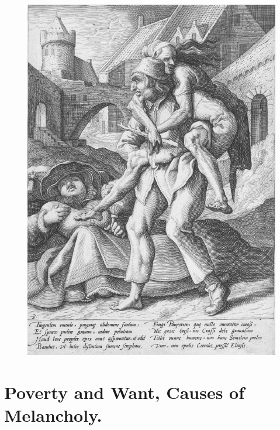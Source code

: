 {\begin{figure}[p]
  \begingroup
  \centering
  \includegraphics[keepaspectratio,width=\textwidth]{figures/carrying-povery-small.jpg}
  \label{fig:povertyriches}
\end{figure}

\clearpage{}
\thispagestyle{titleontop}
\section{Poverty and Want, Causes of Melancholy.}

}
